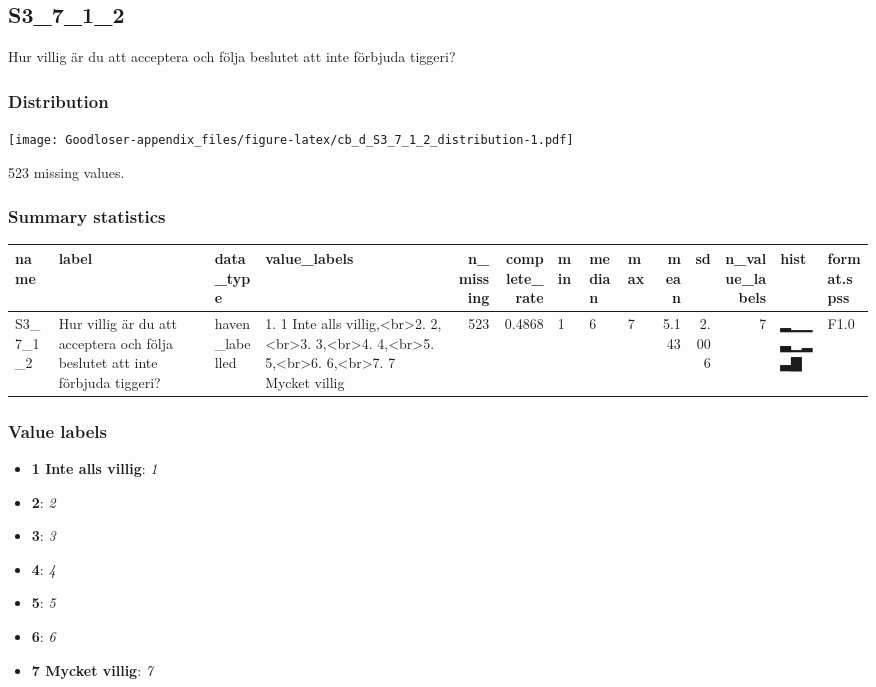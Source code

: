 \documentclass[
]{book}
\providecommand{\tightlist}{%
  \setlength{\itemsep}{0pt}\setlength{\parskip}{0pt}}
\begin{document}
\hypertarget{S3_7_1_2}{%
\subsection{S3\_7\_1\_2}\label{S3_7_1_2}}

Hur villig är du att acceptera och följa beslutet att inte förbjuda tiggeri?

\hypertarget{S3_7_1_2_distribution}{%
\subsubsection{Distribution}\label{S3_7_1_2_distribution}}

\texttt{[image: Goodloser-appendix\_files/figure-latex/cb\_d\_S3\_7\_1\_2\_distribution-1.pdf]}

523 missing values.

\hypertarget{S3_7_1_2_summary}{%
\subsubsection{Summary statistics}\label{S3_7_1_2_summary}}

\begin{tabular}{l|l|l|l|r|r|l|l|l|r|r|r|l|l}
\hline
name & label & data_type & value_labels & n_missing & complete_rate & min & median & max & mean & sd & n_value_labels & hist & format.spss\\
\hline
S3_7_1_2 & Hur villig är du att acceptera och följa beslutet att inte förbjuda tiggeri? & haven_labelled & 1. 1 Inte alls villig,<br>2. 2,<br>3. 3,<br>4. 4,<br>5. 5,<br>6. 6,<br>7. 7 Mycket villig & 523 & 0.4868 & 1 & 6 & 7 & 5.143 & 2.006 & 7 & ▂▁▁▃▁▂▃▇ & F1.0\\
\hline
\end{tabular}

\hypertarget{S3_7_1_2_labels}{%
\subsubsection{Value labels}\label{S3_7_1_2_labels}}

\begin{itemize}
\tightlist
\item
  \textbf{1 Inte alls villig}: \emph{1}
\item
  \textbf{2}: \emph{2}
\item
  \textbf{3}: \emph{3}
\item
  \textbf{4}: \emph{4}
\item
  \textbf{5}: \emph{5}
\item
  \textbf{6}: \emph{6}
\item
  \textbf{7 Mycket villig}: \emph{7}
\end{itemize}
\end{document}
